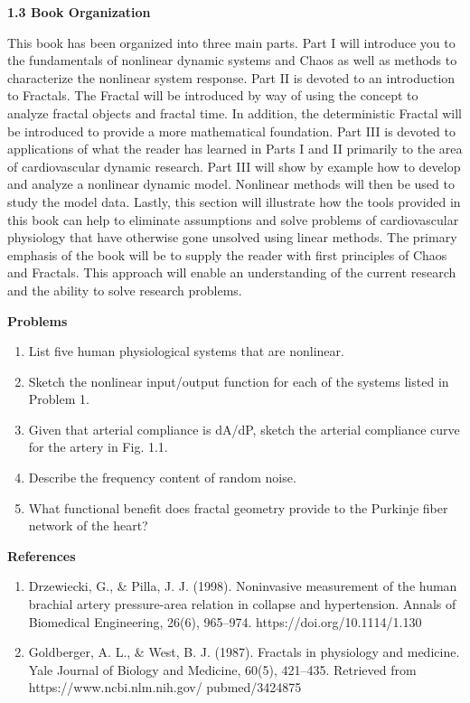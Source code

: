\documentclass{article}
\begin{document}
\hfill

\textbf{1.3 Book Organization}

\hfill

This book has been organized into three main parts. Part I will introduce you to the
fundamentals of nonlinear dynamic systems and Chaos as well as methods to characterize
the nonlinear system response. Part II is devoted to an introduction to
Fractals. The Fractal will be introduced by way of using the concept to analyze
fractal objects and fractal time. In addition, the deterministic Fractal will be introduced
to provide a more mathematical foundation. Part III is devoted to applications
of what the reader has learned in Parts I and II primarily to the area of cardiovascular
dynamic research. Part III will show by example how to develop and analyze a
nonlinear dynamic model. Nonlinear methods will then be used to study the model
data. Lastly, this section will illustrate how the tools provided in this book can help
to eliminate assumptions and solve problems of cardiovascular physiology that have
otherwise gone unsolved using linear methods. The primary emphasis of the book
will be to supply the reader with first principles of Chaos and Fractals. This approach
will enable an understanding of the current research and the ability to solve research problems.

\hfill

\textbf{Problems}

\begin{enumerate}
\item List five human physiological systems that are nonlinear.
\item Sketch the nonlinear input/output function for each of the systems listed in
Problem 1.
\item Given that arterial compliance is dA/dP, sketch the arterial compliance curve for
the artery in Fig. 1.1.
\item Describe the frequency content of random noise.
\item What functional benefit does fractal geometry provide to the Purkinje fiber
network
of the heart?
\end{enumerate}

\hfill

\textbf{References}

\begin{enumerate}
\item Drzewiecki, G., \& Pilla, J. J. (1998). Noninvasive measurement of the human brachial artery
pressure-area relation in collapse and hypertension. Annals of Biomedical Engineering, 26(6),
965–974. https://doi.org/10.1114/1.130
\item Goldberger, A. L., \& West, B. J. (1987). Fractals in physiology and medicine. Yale Journal of
Biology and Medicine, 60(5), 421–435. Retrieved from https://www.ncbi.nlm.nih.gov/
pubmed/3424875
\end{enumerate}
\end{document}
